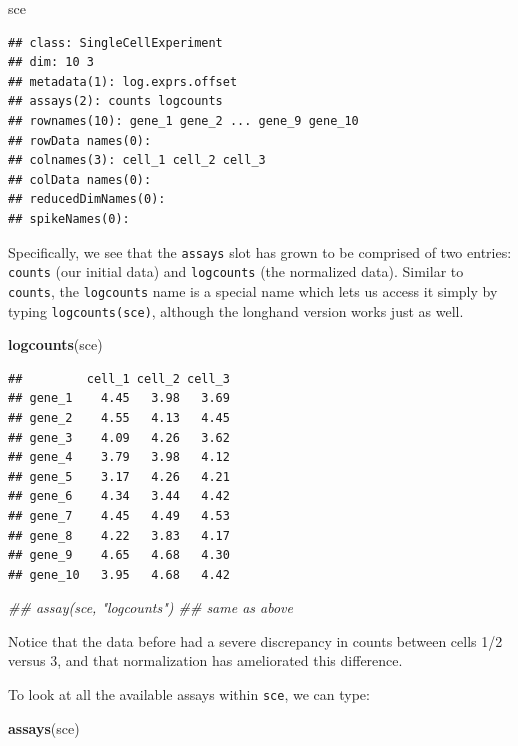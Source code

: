 \documentclass[]{book}
\newenvironment{Shaded}{\begin{snugshade}}{\end{snugshade}}
\newcommand{\CommentTok}[1]{\textcolor[rgb]{0.56,0.35,0.01}{\textit{#1}}}
\newcommand{\KeywordTok}[1]{\textcolor[rgb]{0.13,0.29,0.53}{\textbf{#1}}}
\newcommand{\NormalTok}[1]{#1}
\begin{document}
\begin{Shaded}
\begin{Highlighting}[]
\NormalTok{sce}
\end{Highlighting}
\end{Shaded}

\begin{verbatim}
## class: SingleCellExperiment 
## dim: 10 3 
## metadata(1): log.exprs.offset
## assays(2): counts logcounts
## rownames(10): gene_1 gene_2 ... gene_9 gene_10
## rowData names(0):
## colnames(3): cell_1 cell_2 cell_3
## colData names(0):
## reducedDimNames(0):
## spikeNames(0):
\end{verbatim}

Specifically, we see that the \texttt{assays} slot has grown to be comprised of two entries: \texttt{counts} (our initial data) and \texttt{logcounts} (the normalized data). Similar to \texttt{counts}, the \texttt{logcounts} name is a special name which lets us access it simply by typing \texttt{logcounts(sce)}, although the longhand version works just as well.

\begin{Shaded}
\begin{Highlighting}[]
\KeywordTok{logcounts}\NormalTok{(sce)}
\end{Highlighting}
\end{Shaded}

\begin{verbatim}
##         cell_1 cell_2 cell_3
## gene_1    4.45   3.98   3.69
## gene_2    4.55   4.13   4.45
## gene_3    4.09   4.26   3.62
## gene_4    3.79   3.98   4.12
## gene_5    3.17   4.26   4.21
## gene_6    4.34   3.44   4.42
## gene_7    4.45   4.49   4.53
## gene_8    4.22   3.83   4.17
## gene_9    4.65   4.68   4.30
## gene_10   3.95   4.68   4.42
\end{verbatim}

\begin{Shaded}
\begin{Highlighting}[]
\CommentTok{## assay(sce, "logcounts") ## same as above}
\end{Highlighting}
\end{Shaded}

Notice that the data before had a severe discrepancy in counts between cells 1/2 versus 3, and that normalization has ameliorated this difference.

To look at all the available assays within \texttt{sce}, we can type:

\begin{Shaded}
\begin{Highlighting}[]
\KeywordTok{assays}\NormalTok{(sce)}
\end{Highlighting}
\end{Shaded}
\end{document}

